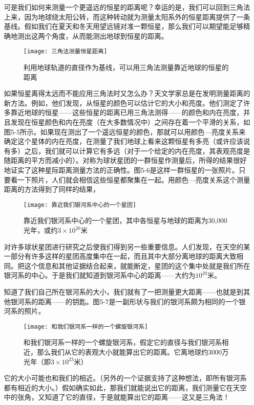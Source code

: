 \documentclass[11pt,oneside]{book}
\begin{document}
\begin{common-format}
可是我们如何来测量一个更遥远的恒星的距离呢？幸运的是，我们可以回到三角法上来，因为地球绕太阳公转，而这种转动就为测量太阳系外的恒星距离提供了一条基线。假如我们在夏天和冬天用望远镜对准一颗恒星，那么我们可以期望能足够精确地测出这两个角度，从而能测出地球到恒星的距离。
\begin{figure}[H]
\centering
\texttt{[image: 三角法测量恒星距离]}
\caption{\footnotesize 利用地球轨道的直径作为基线，可以用三角法测量靠近地球的恒星的距离}
\end{figure}

如果恒星离得太远而不能应用三角法时又怎么办？天文学家总是在发明测量距离的新方法。例如，他们发现，从恒星的颜色可以估计它的大小和亮度。他们测定了许多靠近地球的恒星——这些恒星的距离已用三角法测得——的颜色和内在亮度，并且发现在恒星颜色和内在亮度（在大多数情况中）之间存在着一个平滑的关系，如图5-5所示。如果现在测出了一个遥远恒星的颜色，那就可以用颜色—亮度关系来确定这个星体的内在亮度，在测量了我们地球上看来这颗恒星有多亮（或许应该说有多）之后，我们就可以计算它有多远（对于一个给定的内在亮度，其表观亮度是随距离的平方而减小的）。对称为球状星团的一群恒星作测量后，所得的结果很好地证实了这种星际距离测量方法的正确性。图5-6是这样一群恒星的一张照片。只要看一下照片，人们就会相信这些恒星都聚集在一起。用颜色—亮度关系这个测量距离的方法得到了同样的结果，
\begin{figure}[H]
\centering
\texttt{[image: 靠近我们银河系中心的一个星团]}
\caption{\footnotesize 靠近我们银河系中心的一个星团，其中各恒星与地球的距离为30,000光年，或约$ 3\times 10^{20} $米}
\end{figure}

对许多球状星团进行研究之后使我们得到另一些重要信息。人们发现，在天空的某一部分有许多这样的星团高度集中在一起，而且其中大部分离地球的距离大致相同。把这个信息和其他证据结合起来，就能断定，星团的这个集中处就是我们所在银河系的中心。于是我们就知道到银河系中心的距离——大约为$ 10^{20} $米。

知道了我们自己所在银河系的大小，我们就有了一把测量更大距离——也就是到其他银河系的距离——的钥匙。图5-7是一副形状与我们的银河系颇为相同的一个银河系的照片。
\begin{figure}[H]
\centering
\texttt{[image: 和我们银河系一样的一个螺旋银河系]}
\caption{\footnotesize 和我们银河系一样的一个螺旋银河系，假定它的直径与我们银河系相近，那么我们从它的表观大小就能算出它的距离。它离地球约3000万光年（即$ 3\times 10^{23} $米）}
\end{figure}
它的大小可能也和我们的相近。（另外的一个证据支持了这种想法，即所有银河系都有相近的大小。）假如确实如此，那我们就能说出它的距离，我们测量它在天空中的张角，又知道了它的直径，于是就能算出它的距离——这又是三角法！


\end{common-format}
\end{document}
